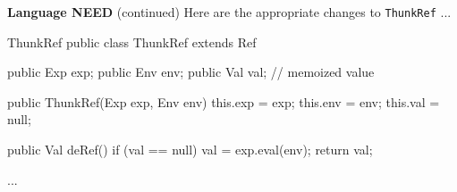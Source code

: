 
\begin{minipage}[t]{\sw}
\slidenumber
\LARGE
{\bf Language NEED} (continued)\exx
\Large
Here are the appropriate changes
to \verb'ThunkRef' ...
\large
\begin{qv}
ThunkRef
public class ThunkRef extends Ref {

    public Exp exp;
    public Env env;
    public Val val; // memoized value

    public ThunkRef(Exp exp, Env env) {
        this.exp = exp;
        this.env = env;
        this.val = null; 
    }

    public Val deRef() {
        if (val == null)
            val = exp.eval(env);
        return val;
    }

...

}
\end{qv}
\end{minipage}
\clearpage
